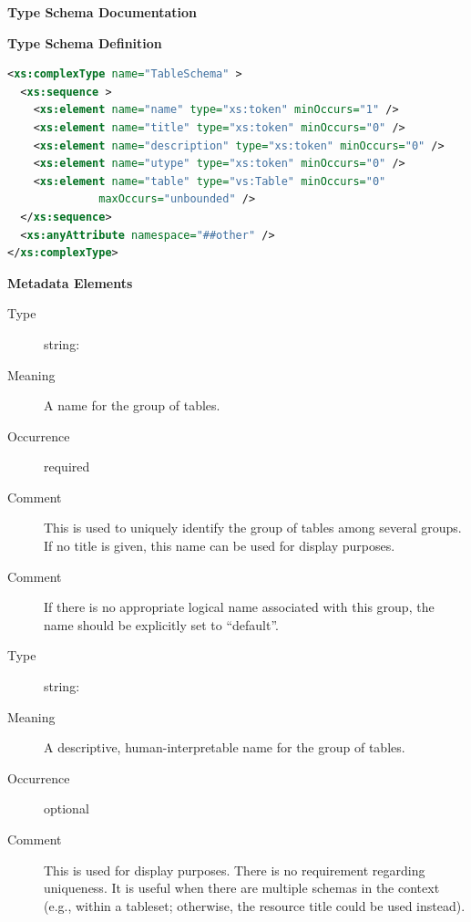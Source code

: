 \documentclass[11pt,a4paper]{ivoa}
\begin{document}
\begin{generated}
\begingroup
        \renewcommand*\descriptionlabel[1]{%
        \hbox to 5.5em{\emph{#1}\hfil}}\vspace{2ex}\noindent\textbf{ Type Schema Documentation}


\vspace{1ex}\noindent\textbf{ Type Schema Definition}

\begin{lstlisting}[language=XML,basicstyle=\footnotesize]
<xs:complexType name="TableSchema" >
  <xs:sequence >
    <xs:element name="name" type="xs:token" minOccurs="1" />
    <xs:element name="title" type="xs:token" minOccurs="0" />
    <xs:element name="description" type="xs:token" minOccurs="0" />
    <xs:element name="utype" type="xs:token" minOccurs="0" />
    <xs:element name="table" type="vs:Table" minOccurs="0"
              maxOccurs="unbounded" />
  </xs:sequence>
  <xs:anyAttribute namespace="##other" />
</xs:complexType>
\end{lstlisting}

\vspace{0.5ex}\noindent\textbf{ Metadata Elements}

\begingroup\small\begin{bigdescription}\item[Element \xmlel{name}]
\begin{description}
\item[Type] string: 
\item[Meaning] A name for the group of tables.
\item[Occurrence] required
\item[Comment] This is used to uniquely identify the group of tables among
               several groups.  If no title is given, this
               name can be used for display purposes.
\item[Comment] If there is no appropriate logical name associated with
               this group, the name should be explicitly set to
               “default”.

\end{description}
\item[Element \xmlel{title}]
\begin{description}
\item[Type] string: 
\item[Meaning] A descriptive, human-interpretable name for the group of
                  tables.
\item[Occurrence] optional
\item[Comment] This is used for display purposes.  There is no requirement
                  regarding uniqueness.  It is useful when there are
                  multiple schemas in the context (e.g., within a
                  tableset; otherwise, the resource title could be
                  used instead).


\end{description}
\end{bigdescription}
\end{generated}
\end{document}
